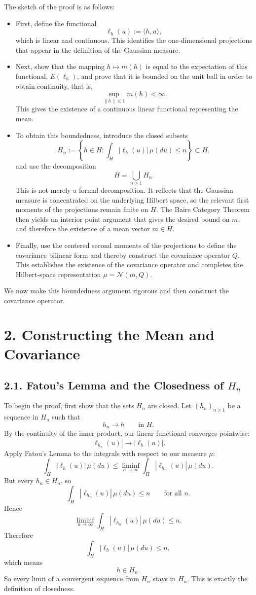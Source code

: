 \documentclass[11pt]{article}
\theoremstyle{definition}
\theoremstyle{remark}
\begin{document}
The sketch of the proof is as follows:
\begin{itemize}
\item First, define the functional
\[
\ell_h(u):=\langle h,u\rangle,
\]
which is linear and continuous. This identifies the one-dimensional projections that appear in the definition of the Gaussian measure.

\item Next, show that the mapping \(h\mapsto m(h)\) is equal to the expectation of this functional, \(E(\ell_h)\), and prove that it is bounded on the unit ball in order to obtain continuity, that is,
\[
\sup_{\|h\|\le 1} m(h)<\infty.
\]
This gives the existence of a continuous linear functional representing the mean.

\item To obtain this boundedness, introduce the closed subsets
\[
H_n:=\left\{h\in H:\int_H |\ell_h(u)|\,\mu(du)\le n\right\}\subset H,
\]
and use the decomposition
\[
H=\bigcup_{n\ge 1} H_n.
\]
This is not merely a formal decomposition. It reflects that the Gaussian measure is concentrated on the underlying Hilbert space, so the relevant first moments of the projections remain finite on \(H\).
The Baire Category Theorem then yields an interior point argument that gives the desired bound on \(m\), and therefore the existence of a mean vector \(m\in H\).

\item Finally, use the centered second moments of the projections to define the covariance bilinear form and thereby construct the covariance operator \(Q\). This establishes the existence of the covariance operator and completes the Hilbert-space representation \(\mu=\mathcal N(m,Q)\).
\end{itemize}

We now make this boundedness argument rigorous and then construct the covariance operator.

\section*{2. Constructing the Mean and Covariance}

\subsection*{2.1. Fatou's Lemma and the Closedness of $H_n$}
To begin the proof, first show that the sets $H_n$ are closed. Let $(h_n)_{n\ge 1}$ be a sequence in $H_n$ such that
\[
h_n\to h
\qquad \text{in } H.
\]
By the continuity of the inner product, our linear functional converges pointwise:
\[
|\ell_{h_n}(u)|\to |\ell_h(u)|.
\]
Apply Fatou's Lemma to the integrals with respect to our measure $\mu$:
\[
\int_H |\ell_h(u)|\,\mu(du)\le \liminf_{n\to\infty}\int_H |\ell_{h_n}(u)|\,\mu(du).
\]
But every $h_n\in H_n$, so
\[
\int_H |\ell_{h_n}(u)|\,\mu(du)\le n
\qquad \text{for all } n.
\]
Hence
\[
\liminf_{n\to\infty}\int_H |\ell_{h_n}(u)|\,\mu(du)\le n.
\]
Therefore
\[
\int_H |\ell_h(u)|\,\mu(du)\le n,
\]
which means
\[
h\in H_n.
\]
So every limit of a convergent sequence from $H_n$ stays in $H_n$. This is exactly the definition of closedness.
\end{document}
